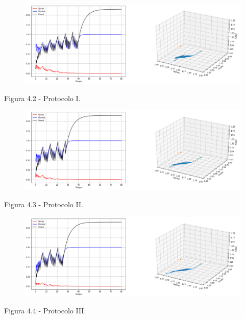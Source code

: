 \documentclass[12pt, a4paper]{article}
\begin{document}
\begin{center}
\begin{figure}[!h]
	\centering
    \includegraphics[scale=0.4]{imgs/plot_trat_1.png}

  \end{figure}


Figura 4.2 - Protocolo I.
\end{center}

\begin{center}
\begin{figure}[!h]
	\centering
    \includegraphics[scale=0.4]{imgs/plot_trat_2.png}

  \end{figure}


Figura 4.3 - Protocolo II.
\end{center}

\begin{center}
\begin{figure}[!h]
	\centering
    \includegraphics[scale=0.4]{imgs/plot_trat_3.png}

  \end{figure}


Figura 4.4 - Protocolo III.
\end{center}
\end{document}
